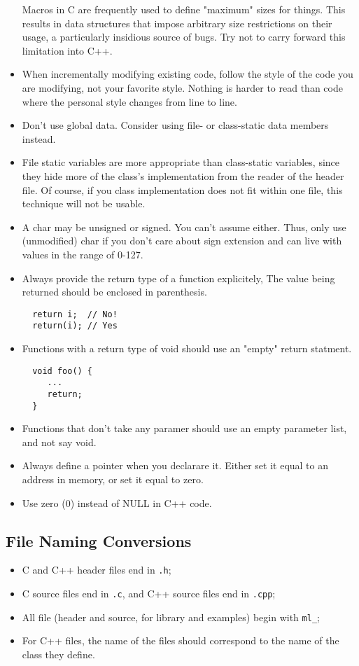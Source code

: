 \documentclass[10pt,letter,relax]{SANDreport}
\begin{document}
\begin{itemize}
  Macros in C are frequently used to define "maximum" sizes for things.
  This results in data structures that impose arbitrary size
  restrictions on their usage, a particularly insidious source of bugs.
  Try not to carry forward this limitation into C++.
\item When incrementally modifying existing code, follow the style of the code you are modifying, not your favorite style. Nothing is harder to read than code where the personal style changes from line to line.
\item Don't use global data. Consider using file- or class-static data members instead.
\item File static variables are more appropriate than class-static
  variables, since they hide more of the class's implementation from the
  reader of the header file. Of course, if you class implementation does
  not fit within one file, this technique will not be usable.
\item A char may be unsigned or signed. You can't assume either. Thus,
  only use (unmodified) char if you don't care about sign extension and
  can live with values in the range of 0-127.
\item Always provide the return type of a function explicitely, The value
  being returned should be enclosed in parenthesis.
  \begin{verbatim}
  return i;  // No!
  return(i); // Yes
  \end{verbatim}
\item Functions with a return type of void should use an "empty" return
  statment.
  \begin{verbatim}
  void foo() {
     ...
     return;
  }
  \end{verbatim}
\item Functions that don't take any paramer should use an empty parameter
list, and not say void.
\item Always define a pointer when you  declarare it. Either set it equal to
an address in memory, or set it equal to zero.
\item Use zero (0) instead of NULL in C++ code.
\end{itemize}

\subsection{File Naming Conversions}

\begin{itemize}
\item C and C++ header files end in \verb!.h!;
\item C source files end in \verb!.c!, and C++ source files end in
\verb!.cpp!;
\item All file (header and source, for library and examples) begin with \verb!ml_!;
\item For C++ files, the name of the files should correspond to the name of
the class they define.
\end{itemize}
\end{document}
